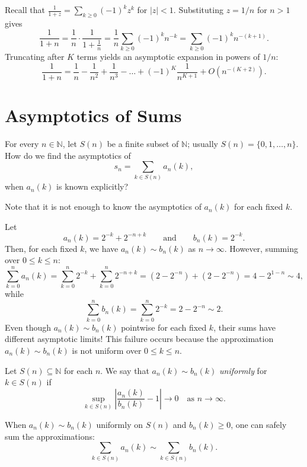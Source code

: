 \begin{example}
    Recall that \(\frac{1}{1+z} = \sum_{k \ge 0} (-1)^k z^k\) for \(|z| < 1\).
    Substituting \(z = 1/n\) for \(n > 1\) gives
    \[
        \frac{1}{1+n} = \frac{1}{n} \cdot \frac{1}{1 + \frac{1}{n}} = \frac{1}{n} \sum_{k \ge 0} (-1)^k n^{-k} = \sum_{k \ge 0} (-1)^k n^{-(k+1)}.
    \]
    Truncating after \(K\) terms yields an asymptotic expansion in powers of \(1/n\):
    \[
        \frac{1}{1+n} = \frac{1}{n} - \frac{1}{n^2} + \frac{1}{n^3} - \dots + (-1)^K \frac{1}{n^{K+1}} + O(n^{-(K+2)}).
    \]
\end{example}

\section*{Asymptotics of Sums}

For every \(n \in \mathbb{N}\), let \(S(n)\) be a finite subset of \(\mathbb{N}\); usually \(S(n) = \{0, 1, \dots, n\}\).
How do we find the asymptotics of 
\[
    s_n = \sum_{k \in S(n)} a_n(k),
\]
when \(a_n(k)\) is known explicitly?

Note that it is not enough to know the asymptotics of \(a_n(k)\) for each fixed \(k\).

\begin{example}
    Let 
    \[
        a_n(k) = 2^{-k} + 2^{-n+k} \qquad \text{and} \qquad b_n(k) = 2^{-k}.
    \]
    Then, for each fixed \(k\), we have \(a_n(k) \sim b_n(k)\) as \(n \to \infty\).
    However, summing over \(0 \le k \le n\):
    \[
        \sum_{k=0}^n a_n(k) = \sum_{k=0}^n 2^{-k} + \sum_{k=0}^n 2^{-n+k} = (2 - 2^{-n}) + (2 - 2^{-n}) = 4 - 2^{1-n} \sim 4,
    \]
    while
    \[
        \sum_{k=0}^n b_n(k) = \sum_{k=0}^n 2^{-k} = 2 - 2^{-n} \sim 2.
    \]
    Even though \(a_n(k) \sim b_n(k)\) pointwise for each fixed \(k\), their sums have different asymptotic limits!
    This failure occurs because the approximation \(a_n(k) \sim b_n(k)\) is not uniform over \(0 \le k \le n\).
\end{example}

\begin{definition}
    Let \(S(n) \subseteq \mathbb{N}\) for each \(n\). We say that \(a_n(k) \sim b_n(k)\) \emph{uniformly} for \(k \in S(n)\) if
    \[
        \sup_{k \in S(n)} \left| \frac{a_n(k)}{b_n(k)} - 1 \right| \to 0 \quad \text{as } n \to \infty.
    \]
\end{definition}
When \(a_n(k) \sim b_n(k)\) uniformly on \(S(n)\) and \(b_n(k) \ge 0\), one can safely sum the approximations:
\[
    \sum_{k \in S(n)} a_n(k) \sim \sum_{k \in S(n)} b_n(k).
\]

